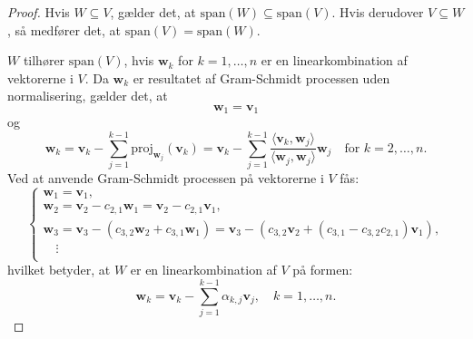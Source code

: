 \begin{proof}
    Hvis \( W \subseteq V \), gælder det, at \(\text{span}(W) \subseteq \text{span}(V)\). Hvis derudover \( V \subseteq W \), så medfører det, at \(\text{span}(V) = \text{span}(W)\). 

    \( W \) tilhører \(\text{span}(V)\), hvis \( \mathbf{w}_k \) for \( k = 1, \ldots, n \) er en linearkombination af vektorerne i \( V \). Da \(\mathbf{w}_k\) er resultatet af Gram-Schmidt processen uden normalisering, gælder det, at 
    \[
    \mathbf{w}_1 = \mathbf{v}_1
    \]
    og 
    \[
    \mathbf{w}_k = \mathbf{v}_k - \sum_{j=1}^{k-1} \text{proj}_{\mathbf{w}_j}(\mathbf{v}_k) = \mathbf{v}_k - \sum_{j=1}^{k-1} \frac{\langle \mathbf{v}_k, \mathbf{w}_j \rangle}{\langle \mathbf{w}_j, \mathbf{w}_j \rangle} \mathbf{w}_j \quad \text{for } k = 2, \ldots, n.
    \]
    Ved at anvende Gram-Schmidt processen på vektorerne i \( V \) fås:
    \[
    \begin{cases}
        \mathbf{w}_1 = \mathbf{v}_1, \\
        \mathbf{w}_2 = \mathbf{v}_2 - c_{2,1} \mathbf{w}_1 = \mathbf{v}_2 - c_{2,1} \mathbf{v}_1, \\
        \mathbf{w}_3 = \mathbf{v}_3 - (c_{3,2} \mathbf{w}_2 + c_{3,1} \mathbf{w}_1) = \mathbf{v}_3 - (c_{3,2} \mathbf{v}_2 + (c_{3,1} - c_{3,2} c_{2,1}) \mathbf{v}_1), \\
        \quad \vdots \\
    \end{cases}
    \]
    hvilket betyder, at \( W \) er en linearkombination af \( V \) på formen:
    \[
    \mathbf{w}_k = \mathbf{v}_k - \sum_{j=1}^{k-1} \alpha_{k,j} \mathbf{v}_j, \quad k = 1, \ldots, n.
    \]
    

\end{proof}
